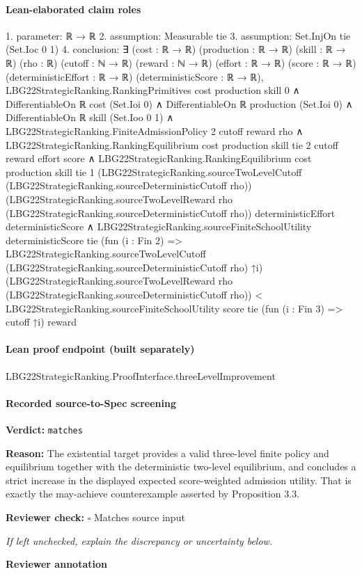 \documentclass[10pt]{article}
\newcommand{\reviewerbox}{%
  \par\noindent\fbox{\parbox{0.96\linewidth}{\rule{0pt}{0.38in}}}\par
}
\newcommand{\reviewmatch}[1]{%
  \par\noindent\textbf{Reviewer check:} $\square$\; #1\par
  \noindent\emph{If left unchecked, explain the discrepancy or uncertainty below.}\par
}
\begin{document}
\paragraph{Lean-elaborated claim roles}\begin{ReviewVerbatim}
1. parameter: ℝ → ℝ
2. assumption: Measurable tie
3. assumption: Set.InjOn tie (Set.Ioc 0 1)
4. conclusion: ∃ (cost : ℝ → ℝ) (production : ℝ → ℝ) (skill : ℝ → ℝ) (rho : ℝ) (cutoff : ℕ → ℝ) (reward : ℕ → ℝ) (effort : ℝ → ℝ)
  (score : ℝ → ℝ) (deterministicEffort : ℝ → ℝ) (deterministicScore : ℝ → ℝ),
  LBG22StrategicRanking.RankingPrimitives cost production skill 0 ∧
    DifferentiableOn ℝ cost (Set.Ioi 0) ∧
      DifferentiableOn ℝ production (Set.Ioi 0) ∧
        DifferentiableOn ℝ skill (Set.Ioo 0 1) ∧
          LBG22StrategicRanking.FiniteAdmissionPolicy 2 cutoff reward rho ∧
            LBG22StrategicRanking.RankingEquilibrium cost production skill tie 2 cutoff reward effort score ∧
              LBG22StrategicRanking.RankingEquilibrium cost production skill tie 1
                  (LBG22StrategicRanking.sourceTwoLevelCutoff (LBG22StrategicRanking.sourceDeterministicCutoff rho))
                  (LBG22StrategicRanking.sourceTwoLevelReward rho (LBG22StrategicRanking.sourceDeterministicCutoff rho))
                  deterministicEffort deterministicScore ∧
                LBG22StrategicRanking.sourceFiniteSchoolUtility deterministicScore tie
                    (fun (i : Fin 2) =>
                      LBG22StrategicRanking.sourceTwoLevelCutoff (LBG22StrategicRanking.sourceDeterministicCutoff rho)
                        ↑i)
                    (LBG22StrategicRanking.sourceTwoLevelReward rho
                      (LBG22StrategicRanking.sourceDeterministicCutoff rho)) <
                  LBG22StrategicRanking.sourceFiniteSchoolUtility score tie (fun (i : Fin 3) => cutoff ↑i) reward
\end{ReviewVerbatim}

\paragraph{Lean proof endpoint (built separately)}\begin{ReviewVerbatim}
LBG22StrategicRanking.ProofInterface.threeLevelImprovement
\end{ReviewVerbatim}

\paragraph{Recorded source-to-Spec screening}
\textbf{Verdict:} \texttt{matches}
\\
{\raggedright
\textbf{Reason:} The existential target provides a valid three-\allowbreak{}level finite policy and equilibrium together with the deterministic two-\allowbreak{}level equilibrium, and concludes a strict increase in the displayed expected score-\allowbreak{}weighted admission utility.\allowbreak{} That is exactly the may-\allowbreak{}achieve counterexample asserted by Proposition 3.\allowbreak{}3.\allowbreak{}
\par}
\reviewmatch{Matches source input}
\noindent\textbf{Reviewer annotation}\par
\reviewerbox
\clearpage
\hypertarget{source-claim-f1c09a02beccebed}{}
\end{document}
